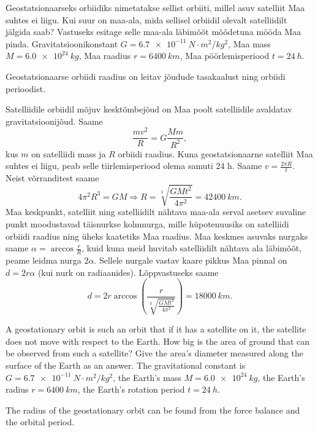 
Geostatsionaarseks orbiidiks nimetatakse sellist orbiiti, millel asuv satelliit
Maa suhtes ei liigu. Kui suur on maa-ala, mida sellisel orbiidil olevalt
satelliidilt jälgida saab? Vastuseks esitage selle maa-ala läbimõõt mõõdetuna
mööda Maa pinda. Gravitatsioonikonstant $G=\SI{6.7e-11}{N \cdot m^2/kg^2}$, Maa
mass $M=\SI{6,0e24}{kg}$, Maa raadius $r=\SI{6400}{km}$, Maa
pöörlemisperiood $t=\SI{24}{h}$.

\hint
Geostatsionaarse orbiidi raadius on leitav jõudude tasakaalust ning orbiidi perioodist.

\solu
Satelliidile orbiidil mõjuv kesktõmbejõud on Maa poolt satelliidile avaldatav gravitatsioonijõud. Saame $$\frac{mv^2}{R}=G\frac{Mm}{R^2},$$kus $m$ on satelliidi mass ja $R$ orbiidi raadius. Kuna geostatsionaarne satelliit Maa suhtes ei liigu, peab selle tiirlemisperiood olema samuti 24 h. Saame $v=\frac{2\pi R}{t}$. Neist võrranditest saame $$4\pi^2 R^3=GM \Rightarrow R=\sqrt[3]{\frac{GMt^2}{4\pi^2}}=\SI{42400}{km}.$$ Maa keskpunkt, satelliit ning satelliidilt nähtava maa-ala serval asetsev suvaline punkt moodustavad täisnurkse kolmnurga, mille hüpotenuusiks on satelliidi orbiidi raadius ning üheks kaatetiks Maa raadius. Maa keskmes asuvaks nurgaks saame $\alpha=\arccos{\frac{r}{R}}$, kuid kuna meid huvitab satelliidilt nähtava ala läbimõõt, peame leidma nurga $2\alpha$. Sellele nurgale vastav kaare pikkus Maa pinnal on $d=2r\alpha$ (kui nurk on radiaanides). Lõppvastuseks saame 
$$d=2r\arccos \left(\frac{r}{\sqrt[3]{\frac{GMt^2}{4\pi^2}}}\right) =\SI{18000}{km}.$$

A geostationary orbit is such an orbit that if it has a satellite on it, the satellite does not move with respect to the Earth. How big is the area of ground that can be observed from such a satellite? Give the area’s diameter measured along the surface of the Earth as an answer. The gravitational constant is $G=\SI{6.7e-11}{N \cdot m^2/kg^2}$, the Earth’s mass $M=\SI{6,0e24}{kg}$, the Earth’s radius $r=\SI{6400}{km}$, the Earth’s rotation period $t=\SI{24}{h}$.

\hinteng
The radius of the geostationary orbit can be found from the force balance and the orbital period.

